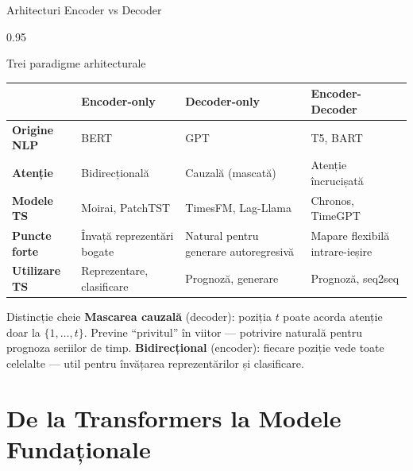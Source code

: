 \documentclass[9pt, aspectratio=169, t]{beamer}
\begin{document}
\begin{frame}{Arhitecturi Encoder vs Decoder}
    \begin{cminipage}{0.95\textwidth}
    \vspace{-2mm}
    {\footnotesize
    \begin{block}{Trei paradigme arhitecturale}
    \vspace{-2mm}
    \begin{center}
    \begin{tabular}{l|p{3cm}|p{3cm}|p{3.5cm}}
        \toprule
        & \textbf{Encoder-only} & \textbf{Decoder-only} & \textbf{Encoder-Decoder} \\
        \midrule
        \textbf{Origine NLP} & BERT & GPT & T5, BART \\
        \textbf{Atenție} & Bidirecțională & Cauzală (mascată) & Atenție încrucișată \\
        \textbf{Modele TS} & Moirai, PatchTST & TimesFM, Lag-Llama & Chronos, TimeGPT \\
        \textbf{Puncte forte} & Învață reprezentări bogate & Natural pentru generare autoregresivă & Mapare flexibilă intrare-ieșire \\
        \textbf{Utilizare TS} & Reprezentare, clasificare & Prognoză, generare & Prognoză, seq2seq \\
        \bottomrule
    \end{tabular}
    \end{center}
    \vspace{-2mm}
    \end{block}
    }
    \vspace{-2mm}
    \begin{exampleblock}{Distincție cheie}
        {\small \textbf{Mascarea cauzală} (decoder): poziția $t$ poate acorda atenție doar la $\{1, \ldots, t\}$. Previne ``privitul'' în viitor --- potrivire naturală pentru prognoza seriilor de timp. \textbf{Bidirecțional} (encoder): fiecare poziție vede toate celelalte --- util pentru învățarea reprezentărilor și clasificare.}
    \end{exampleblock}
    \end{cminipage}
\end{frame}

\section{De la Transformers la Modele Fundaționale}
\end{document}
